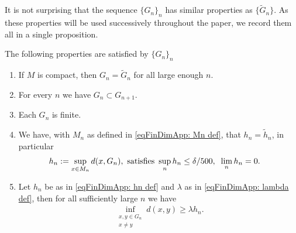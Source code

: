\documentclass[11pt,reqno]{amsart}
\numberwithin{equation}{section}
\theoremstyle{plain}
\begin{document}
  It is not surprising that the sequence $\{G_n\}_n$ has similar properties as $\{\tilde G_n\}$. As these properties will be used successively throughout the paper, we record them all in a single proposition. 
  \begin{prop}\label{prop: Properties of G_n}
    The following properties are satisfied by $\{G_n\}_n$
    \begin{enumerate}
      \item If $M$ is compact, then $G_n=\tilde G_n$ for all large enough $n$.		
      \item For every $n$ we have $G_n\subset G_{n+1}$.
      \item Each $G_n$ is finite.
      \item We have, with $M_n$ as defined in \eqref{eqFinDimApp: Mn def}, that $h_n = \tilde h_n$, in particular
      \begin{align}\label{eqFinDimApp: hn def}
        h_n & := \sup \limits_{x\in M_n}d(x,G_n), \textnormal{ satisfies } \sup \limits_{n} h_n \leq \delta/500,\;\;\lim\limits_{n} h_n = 0.
      \end{align}
      \item Let $h_n$ be as in \eqref{eqFinDimApp: hn def} and $\lambda$ as in \eqref{eqFinDimApp: lambda def}, then for all sufficiently large $n$ we have
      \begin{align}\label{eqFinDimApp: hn regularity property}
        \inf \limits_{\substack{x,y\in G_n \\ x\neq y}} d(x,y) \geq \lambda h_n.
      \end{align} 
    \end{enumerate}		
  \end{prop}
  
\end{document}
